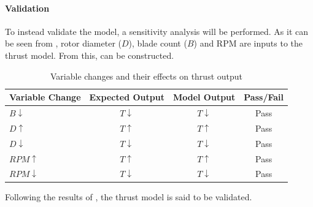 \paragraph{Validation}To instead validate the model, a sensitivity analysis will be performed.
As it can be seen from , rotor diameter ($D$), blade count ($B$) and RPM are inputs to the thrust model.
From this,  can be constructed.
\begin{table}[H]
    \centering
    \begin{tabular}{l|ccc}
        \toprule
        \textbf{Variable Change} & \textbf{Expected Output} & \textbf{Model Output} & \textbf{Pass/Fail} \\
        \midrule
        $B \downarrow$           & $T \downarrow$           & $T \downarrow$        & Pass               \\
        $D \uparrow$             & $T \uparrow$             & $T \uparrow$          & Pass               \\
        $D \downarrow$           & $T \downarrow$           & $T \downarrow$        & Pass               \\
        $RPM \uparrow$           & $T \uparrow$             & $T \uparrow$          & Pass               \\
        $RPM \downarrow$         & $T \downarrow$           & $T \downarrow$        & Pass               \\
        \bottomrule
    \end{tabular}
    \caption{Variable changes and their effects on thrust output}
    \label{tab:sensitivitythrust}
\end{table}
Following the results of , the thrust model is said to be validated.



